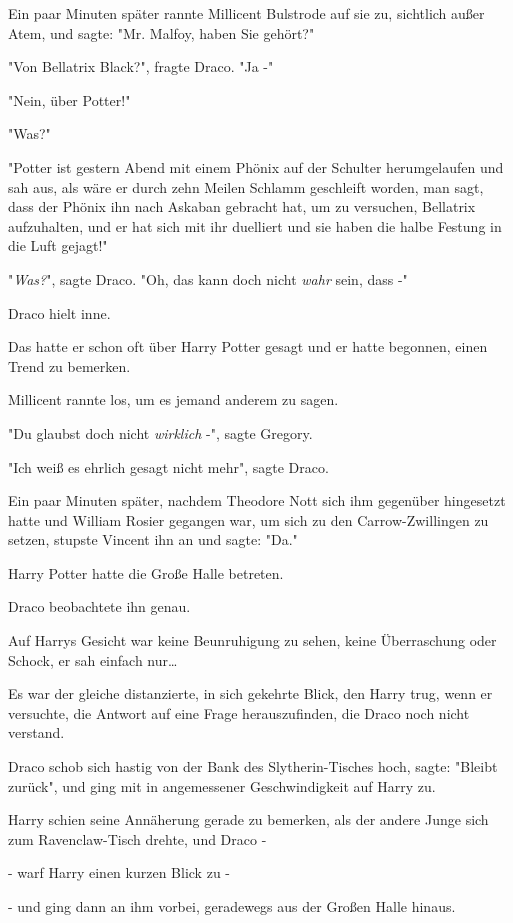 {Ein paar Minuten später rannte Millicent Bulstrode auf sie zu, sichtlich außer Atem, und sagte: "Mr. Malfoy, haben Sie gehört?"

"Von Bellatrix Black?", fragte Draco. "Ja -"

"Nein, über Potter!"

"Was?"

"Potter ist gestern Abend mit einem Phönix auf der Schulter herumgelaufen und sah aus, als wäre er durch zehn Meilen Schlamm geschleift worden, man sagt, dass der Phönix ihn nach Askaban gebracht hat, um zu versuchen, Bellatrix aufzuhalten, und er hat sich mit ihr duelliert und sie haben die halbe Festung in die Luft gejagt!"

"\emph{Was?}", sagte Draco. "Oh, das kann doch nicht \emph{wahr} sein, dass -"

Draco hielt inne.

Das hatte er schon oft über Harry Potter gesagt und er hatte begonnen, einen Trend zu bemerken.

Millicent rannte los, um es jemand anderem zu sagen.

"Du glaubst doch nicht \emph{wirklich} -", sagte Gregory.

"Ich weiß es ehrlich gesagt nicht mehr", sagte Draco.

Ein paar Minuten später, nachdem Theodore Nott sich ihm gegenüber hingesetzt hatte und William Rosier gegangen war, um sich zu den Carrow-Zwillingen zu setzen, stupste Vincent ihn an und sagte: "Da."

Harry Potter hatte die Große Halle betreten.

Draco beobachtete ihn genau.

Auf Harrys Gesicht war keine Beunruhigung zu sehen, keine Überraschung oder Schock, er sah einfach nur…

Es war der gleiche distanzierte, in sich gekehrte Blick, den Harry trug, wenn er versuchte, die Antwort auf eine Frage herauszufinden, die Draco noch nicht verstand.

Draco schob sich hastig von der Bank des Slytherin-Tisches hoch, sagte: "Bleibt zurück", und ging mit in angemessener Geschwindigkeit auf Harry zu.

Harry schien seine Annäherung gerade zu bemerken, als der andere Junge sich zum Ravenclaw-Tisch drehte, und Draco -

- warf Harry einen kurzen Blick zu -

- und ging dann an ihm vorbei, geradewegs aus der Großen Halle hinaus.

}
